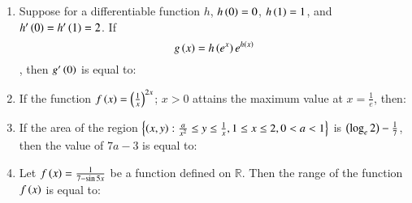 \documentclass[journal,12pt,onecolumn]{IEEEtran}
\theoremstyle{remark}
\begin{document}
\begin{enumerate}
\begin{enumerate}
\end{enumerate}
\item Suppose for a differentiable function $h$, $h\left(0\right) = 0$, $h\left(1\right) = 1$, and $h'\left(0\right) = h'\left(1\right) = 2$. If $$g\left(x\right) = h\left(e^x\right)e^{h\left(x\right)}$$, then $g'\left(0\right)$ is equal to:
\begin{enumerate}
\end{enumerate}
\item If the function $f\left(x\right) = \left(\frac{1}{x}\right)^{2x}$; $x > 0$ attains the maximum value at $x = \frac{1}{e}$, then:
\begin{enumerate}
\end{enumerate}
\item If the area of the region $\left\{\left(x, y\right):\frac{a}{x^2}\leq y\leq \frac{1}{x}, 1 \leq x \leq 2, 0 < a < 1\right\}$ is $\left(\log_e 2\right) -\frac{1}{7}$, then the value of $7a - 3$ is equal to:
\begin{enumerate}
\end{enumerate}
\item Let $f\left(x\right) = \frac{1}{7-\sin 5x}$ be a function defined on $\mathbb{R}$. Then the range of the function $f\left(x\right)$ is equal to:

\end{enumerate}
\end{document}
